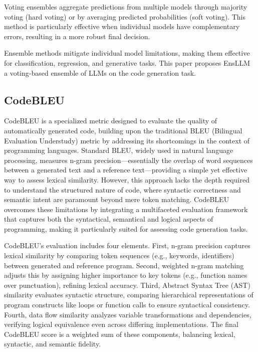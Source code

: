 \documentclass{article}
\newcommand{\tool}{EnsLLM}
\begin{document}
Voting \cite{kittler1998combining} ensembles aggregate predictions from multiple models through majority voting (hard voting) or by averaging predicted probabilities (soft voting). This method is particularly effective when individual models have complementary errors, resulting in a more robust final decision. 

Ensemble methods mitigate individual model limitations, making them effective for classification, regression, and generative tasks. This paper proposes \tool\, a voting-based ensemble of LLMs on the code generation task.

\subsection{CodeBLEU}
CodeBLEU \cite{codebleu} is a specialized metric designed to evaluate the quality of automatically generated code, building upon the traditional BLEU (Bilingual Evaluation Understudy) metric by addressing its shortcomings in the context of programming languages. Standard BLEU, widely used in natural language processing, measures n-gram precision—essentially the overlap of word sequences between a generated text and a reference text—providing a simple yet effective way to assess lexical similarity. However, this approach lacks the depth required to understand the structured nature of code, where syntactic correctness and semantic intent are paramount beyond mere token matching. CodeBLEU overcomes these limitations by integrating a multifaceted evaluation framework that captures both the syntactical, semantical and logical aspects of programming, making it particularly suited for assessing code generation tasks.

CodeBLEU’s evaluation includes four elements. First, n-gram precision captures lexical similarity by comparing token sequences (e.g., keywords, identifiers) between generated and reference program. Second, weighted n-gram matching adjusts this by assigning higher importance to key tokens (e.g., function names over punctuation), refining lexical accuracy. Third, Abstract Syntax Tree (AST) similarity evaluates syntactic structure, comparing hierarchical representations of program constructs like loops or function calls to ensure syntactical consistency. Fourth, data flow similarity analyzes variable transformations and dependencies, verifying logical equivalence even across differing implementations. The final CodeBLEU score is a weighted sum of these components, balancing lexical, syntactic, and semantic fidelity.
\end{document}
